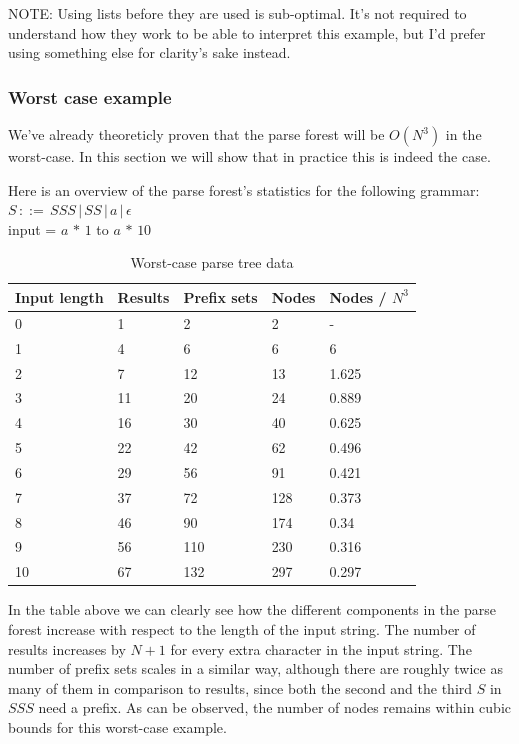 \documentclass[a4paper,10pt]{article}
\begin{document}
NOTE: Using lists before they are used is sub-optimal. It's not required to understand how they work to be able to interpret this example, but I'd prefer using something else for clarity's sake instead.

\subsubsection{Worst case example}

We've already theoreticly proven that the parse forest will be $O(N^3)$ in the worst-case. In this section we will show that in practice this is indeed the case.

Here is an overview of the parse forest's statistics for the following grammar:\\
$S\,::=\,SSS\,|\,SS\,|\,a\,|\,\epsilon$\\
input = $a\,*\,1$ to $a\,*\,10$

\begin{table}[H]
\centering
\begin{tabular}{ | p{6em} | p{4em} | p{5em} | p{4em} | p{5em} | }
  \hline
  Input length & Results & Prefix sets & Nodes & Nodes / $N^3$ \\
  \hline
  0 & 1 & 2 & 2 & - \\
  1 & 4 & 6 & 6 & 6 \\
  2 & 7 & 12 & 13 & 1.625 \\
  3 & 11 & 20 & 24 & 0.889 \\
  4 & 16 & 30 & 40 & 0.625 \\
  5 & 22 & 42 & 62 & 0.496 \\
  6 & 29 & 56 & 91 & 0.421 \\
  7 & 37 & 72 & 128 & 0.373 \\
  8 & 46 & 90 & 174 & 0.34 \\
  9 & 56 & 110 & 230 & 0.316 \\
  10 & 67 & 132 & 297 & 0.297 \\
  \hline
\end{tabular}
\caption{Worst-case parse tree data}
\end{table}

In the table above we can clearly see how the different components in the parse forest increase with respect to the length of the input string. The number of results increases by $N + 1$ for every extra character in the input string. The number of prefix sets scales in a similar way, although there are roughly twice as many of them in comparison to results, since both the second and the third $S$ in $SSS$ need a prefix. As can be observed, the number of nodes remains within cubic bounds for this worst-case example.
\end{document}
